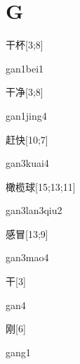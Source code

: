 \section*{G}

\begin{verbete}{干杯}[3;8]
\begin{pronuncia}{gan1bei1}
\end{pronuncia}
\end{verbete}

\begin{verbete}{干净}[3;8]
\begin{pronuncia}{gan1jing4}
\end{pronuncia}
\end{verbete}

\begin{verbete}{赶快}[10;7]
\begin{pronuncia}{gan3kuai4}
\end{pronuncia}
\end{verbete}

\begin{verbete}{橄榄球}[15;13;11]
\begin{pronuncia}{gan3lan3qiu2}
\end{pronuncia}
\end{verbete}

\begin{verbete}{感冒}[13;9]
\begin{pronuncia}{gan3mao4}
\end{pronuncia}
\end{verbete}

\begin{verbete}[gan4]{干}[3]
\begin{pronuncia}{gan4}
\end{pronuncia}
\end{verbete}

\begin{verbete}[gang1]{刚}[6]
\begin{pronuncia}{gang1}
\end{pronuncia}
\end{verbete}

